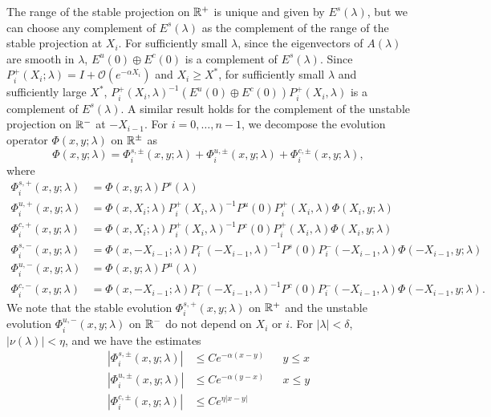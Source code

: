 \documentclass[10pt,reqno]{amsart}
\theoremstyle{plain}
\theoremstyle{definition}
\theoremstyle{remark}
\numberwithin{theorem}{section}
\numberwithin{equation}{section}
\begin{document}
The range of the stable projection on $\mathbb{R}^+$ is unique and given by $E^s(\lambda)$, but we can choose any complement of $E^s(\lambda)$ as the complement of the range of the stable projection at $X_i$. For sufficiently small $\lambda$, since the eigenvectors of $A(\lambda)$ are smooth in $\lambda$, $E^u(0)\oplus E^c(0)$ is a complement of $E^s(\lambda)$. Since $P_i^+(X_i; \lambda) = I + \mathcal{O}(e^{-\alpha X_i})$ and $X_i \geq X^*$, for sufficiently small $\lambda$ and sufficiently large $X^*$, $P_i^+(X_i, \lambda)^{-1} ( E^u(0)\oplus E^c(0) ) P_i^+(X_i, \lambda)$ is a complement of $E^s(\lambda)$. A similar result holds for the complement of the unstable projection on $\mathbb{R}^-$ at $-X_{i-1}$. For $i = 0, \dots, n-1$, we decompose the evolution operator $\Phi(x,y; \lambda)$ on $\mathbb{R}^\pm$ as
\begin{equation}\label{Phidecomp}
\Phi(x, y; \lambda) = \Phi_i^{s,\pm}(x, y; \lambda) + \Phi_i^{u,\pm}(x, y; \lambda) + \Phi_i^{c,\pm}(x, y; \lambda),
\end{equation}
where
\begin{equation}\label{Zevolmod}
\begin{aligned}
\Phi_i^{s,+}(x, y; \lambda) &= \Phi(x, y; \lambda) P^s(\lambda) \\
\Phi_i^{u,+}(x, y; \lambda) &= \Phi(x, X_i; \lambda) P_i^+(X_i, \lambda)^{-1}
P^u(0) P_i^+(X_i, \lambda) \Phi(X_i, y; \lambda) \\
\Phi_i^{c,+}(x, y; \lambda) &= \Phi(x, X_i; \lambda) P_i^+(X_i, \lambda)^{-1}
P^c(0) P_i^+(X_i, \lambda) \Phi(X_i, y; \lambda)  \\
\Phi_i^{s,-}(x, y; \lambda) &= \Phi(x, -X_{i-1}; \lambda) P_i^-(-X_{i-1}, \lambda)^{-1}
P^s(0) P_i^-(-X_{i-1}, \lambda) \Phi(-X_{i-1}, y; \lambda) \\
\Phi_i^{u,-}(x, y; \lambda) &= \Phi(x, y; \lambda) P^u(\lambda) \\
\Phi_i^{c,-}(x, y; \lambda) &= \Phi(x, -X_{i-1}; \lambda) P_i^-(-X_{i-1}, \lambda)^{-1}
P^c(0) P_i^-(-X_{i-1}, \lambda) \Phi(-X_{i-1}, y; \lambda).
\end{aligned}
\end{equation}
We note that the stable evolution $\Phi_i^{s,+}(x, y; \lambda)$ on $\mathbb{R}^+$ and the unstable evolution $\Phi_i^{u,-}(x, y; \lambda)$ on $\mathbb{R}^-$ do not depend on $X_i$ or $i$. For $|\lambda| < \delta$, $|\nu(\lambda)| < \eta$, and we have the estimates
\begin{equation}\label{Zevolbounds}
\begin{aligned}
|\Phi_i^{s,\pm}(x, y; \lambda)| &\leq C e^{-\alpha(x - y)} && y \leq x \\
|\Phi_i^{u,\pm}(x, y; \lambda)| &\leq C e^{-\alpha(y - x)} && x \leq y \\
|\Phi_i^{c,\pm}(x, y; \lambda)| &\leq C e^{\eta|x - y|} 
\end{aligned}
\end{equation}
\end{document}
